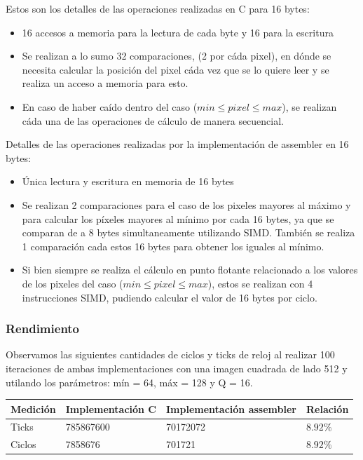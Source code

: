 Estos son los detalles de las operaciones realizadas en C para 16 bytes:
\begin{itemize}
\item 16 accesos a memoria para la lectura de cada byte y 16 para la escritura
\item Se realizan a lo sumo 32 comparaciones, (2 por cáda pixel), en dónde se necesita calcular la posición del pixel cáda vez que se lo quiere leer y se realiza un acceso a memoria para esto.
\item En caso de haber caído dentro del caso ($min \leq pixel \leq max$), se realizan cáda una de las operaciones de cálculo de manera secuencial.
\end{itemize}
Detalles de las operaciones realizadas por la implementación de assembler en 16 bytes:
\begin{itemize}
\item Única lectura y escritura en memoria de 16 bytes
\item Se realizan 2 comparaciones para el caso de los pixeles mayores al máximo y para calcular los píxeles mayores al mínimo por cada 16 bytes, ya que se comparan de a 8 bytes simultaneamente utilizando SIMD. También se realiza 1 comparación cada estos 16 bytes para obtener los iguales al mínimo.
\item Si bien siempre se realiza el cálculo en punto flotante relacionado a los valores de los pixeles del caso ($min \leq pixel \leq max$), estos se realizan con 4 instrucciones SIMD, pudiendo calcular el valor de 16 bytes por ciclo.
\end{itemize}

\subsubsection{Rendimiento}
Observamos las siguientes cantidades de ciclos y ticks de reloj al realizar 100 iteraciones de ambas implementaciones con una imagen cuadrada de lado 512 y utilando los parámetros: mín = 64, máx = 128 y Q = 16.
\begin{center}
    \begin{tabular}{|l|l|l|l|}
        \hline
        Medición & Implementación C & Implementación assembler & Relación \\
        \hline
        Ticks    & 785867600      & 70172072               & $8.92\%$ \\
        Ciclos   & 7858676        & 701721                & $8.92\%$ \\
        \hline
    \end{tabular}
\end{center}

